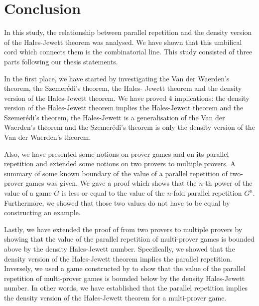 \chapter{Conclusion}

In this study, the relationship between parallel repetition and the density version of the Hales-Jewett theorem was analysed. We have shown that this umbilical cord which connects them is the combinatorial line. This study consisted of three parts  following our thesis statements. 

In the first place, we have started by investigating 
the Van der Waerden's theorem,  the Szemerédi's theorem, the Hales- Jewett theorem
and the density version of the Hales-Jewett theorem. We have proved 4 implications: the density version of the Hales-Jewett theorem implies the Hales-Jewett theorem and the Szemerédi's theorem, the Hales-Jewett is a generalisation of the Van der Waerden's theorem and the Szemerédi's theorem is only the density version of the Van der Waerden's theorem.

Also, we have  presented
some notions on prover games and on its parallel repetition and extended some notions on two provers  to multiple provers. A summary of some known boundary of the value of a parallel repetition of two-prover games was given. We  gave a proof which shows that the $n$-th power of the value of a game $G$  is less or equal to the value of the $n$-fold parallel repetition $G^n.$ Furthermore, we showed that those two values do not have to be equal by constructing  an example.

Lastly, we  have extended the proof of \cite{verbitsky1996towards}  from two provers to multiple provers by showing that the value of the parallel repetition of multi-prover games is bounded above by the density Hales-Jewett number. Specifically, we showed that the density version of the Hales-Jewett theorem implies the parallel repetition. Inversely, we used a game constructed by \cite*{hkazla2016forbidden} to show that the value of the parallel repetition of multi-prover games is bounded below by the density Hales-Jewett number. In other words, we have established that the parallel repetition implies the density version of the Hales-Jewett theorem for a multi-prover game.


